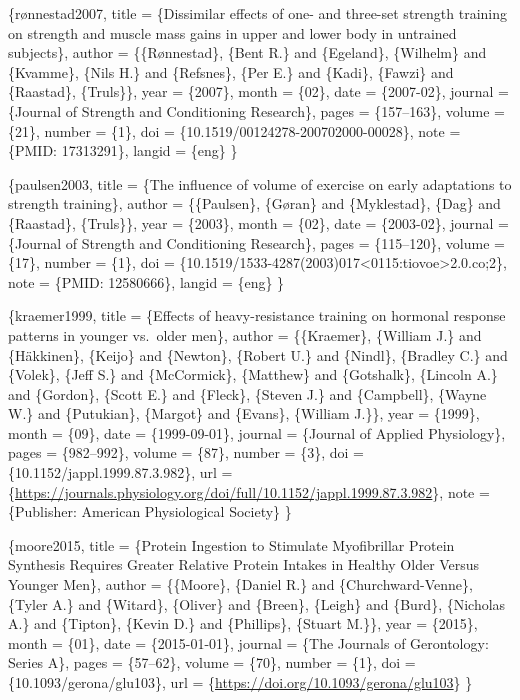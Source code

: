 \documentclass[
]{book}
\begin{document}
\citet{article}\{rønnestad2007,
title = \{Dissimilar effects of one- and three-set strength training on strength and muscle mass gains in upper and lower body in untrained subjects\},
author = \{\{Rønnestad\}, \{Bent R.\} and \{Egeland\}, \{Wilhelm\} and \{Kvamme\}, \{Nils H.\} and \{Refsnes\}, \{Per E.\} and \{Kadi\}, \{Fawzi\} and \{Raastad\}, \{Truls\}\},
year = \{2007\},
month = \{02\},
date = \{2007-02\},
journal = \{Journal of Strength and Conditioning Research\},
pages = \{157--163\},
volume = \{21\},
number = \{1\},
doi = \{10.1519/00124278-200702000-00028\},
note = \{PMID: 17313291\},
langid = \{eng\}
\}

\citet{article}\{paulsen2003,
title = \{The influence of volume of exercise on early adaptations to strength training\},
author = \{\{Paulsen\}, \{Gøran\} and \{Myklestad\}, \{Dag\} and \{Raastad\}, \{Truls\}\},
year = \{2003\},
month = \{02\},
date = \{2003-02\},
journal = \{Journal of Strength and Conditioning Research\},
pages = \{115--120\},
volume = \{17\},
number = \{1\},
doi = \{10.1519/1533-4287(2003)017\textless0115:tiovoe\textgreater2.0.co;2\},
note = \{PMID: 12580666\},
langid = \{eng\}
\}

\citet{article}\{kraemer1999,
title = \{Effects of heavy-resistance training on hormonal response patterns in younger vs.~older men\},
author = \{\{Kraemer\}, \{William J.\} and \{Häkkinen\}, \{Keijo\} and \{Newton\}, \{Robert U.\} and \{Nindl\}, \{Bradley C.\} and \{Volek\}, \{Jeff S.\} and \{McCormick\}, \{Matthew\} and \{Gotshalk\}, \{Lincoln A.\} and \{Gordon\}, \{Scott E.\} and \{Fleck\}, \{Steven J.\} and \{Campbell\}, \{Wayne W.\} and \{Putukian\}, \{Margot\} and \{Evans\}, \{William J.\}\},
year = \{1999\},
month = \{09\},
date = \{1999-09-01\},
journal = \{Journal of Applied Physiology\},
pages = \{982--992\},
volume = \{87\},
number = \{3\},
doi = \{10.1152/jappl.1999.87.3.982\},
url = \{\url{https://journals.physiology.org/doi/full/10.1152/jappl.1999.87.3.982}\},
note = \{Publisher: American Physiological Society\}
\}

\citet{article}\{moore2015,
title = \{Protein Ingestion to Stimulate Myofibrillar Protein Synthesis Requires Greater Relative Protein Intakes in Healthy Older Versus Younger Men\},
author = \{\{Moore\}, \{Daniel R.\} and \{Churchward-Venne\}, \{Tyler A.\} and \{Witard\}, \{Oliver\} and \{Breen\}, \{Leigh\} and \{Burd\}, \{Nicholas A.\} and \{Tipton\}, \{Kevin D.\} and \{Phillips\}, \{Stuart M.\}\},
year = \{2015\},
month = \{01\},
date = \{2015-01-01\},
journal = \{The Journals of Gerontology: Series A\},
pages = \{57--62\},
volume = \{70\},
number = \{1\},
doi = \{10.1093/gerona/glu103\},
url = \{\url{https://doi.org/10.1093/gerona/glu103}\}
\}
\end{document}
